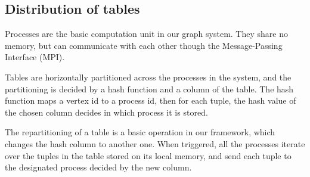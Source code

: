 \documentclass{sokendai_thesis} %
\begin{document}
\subsection{Distribution of tables}
\label{sec:data-distr}

Processes are the basic computation unit in our graph system.
They share no memory, but can communicate with each other though the Message-Passing Interface (MPI).

Tables are horizontally partitioned across the processes in the system, and the partitioning is decided by a hash function and a column of the table.
The hash function maps a vertex id to a process id, then for each tuple, the hash value of the chosen column decides in which process it is stored.

The repartitioning of a table is a basic operation in our framework, which changes the hash column to another one.
When triggered, all the processes iterate over the tuples in the table stored on its local memory, and send each tuple to the designated process decided by the new column.
\end{document}
